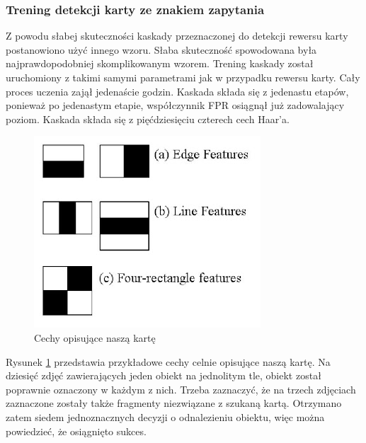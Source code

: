 \subsubsection{Trening detekcji karty ze znakiem zapytania}

Z powodu słabej skuteczności kaskady przeznaczonej do detekcji rewersu karty postanowiono użyć innego wzoru. Słaba skuteczność spowodowana była najprawdopodobniej skomplikowanym wzorem. Trening kaskady został uruchomiony z takimi samymi parametrami jak w przypadku rewersu karty. Cały proces uczenia zajął jedenaście godzin. Kaskada składa się z jedenastu etapów, ponieważ po jedenastym etapie, współczynnik FPR osiągnął już zadowalający poziom. Kaskada składa się z pięćdziesięciu czterech cech Haar'a.

\begin{figure}[H]
	\centering
	\includegraphics[scale=0.2]{imgs/cechy?.png}
	\caption{Cechy opisujące naszą kartę}
	\label{fig:cechy?}
\end{figure}

Rysunek \ref{fig:cechy?} przedstawia przykładowe cechy celnie opisujące naszą kartę. Na dziesięć zdjęć zawierających jeden obiekt na jednolitym tle, obiekt został poprawnie oznaczony w każdym z nich. Trzeba zaznaczyć, że na trzech zdjęciach zaznaczone zostały także fragmenty niezwiązane z szukaną kartą. Otrzymano zatem siedem jednoznacznych decyzji o odnalezieniu obiektu, więc można powiedzieć, że osiągnięto sukces.
